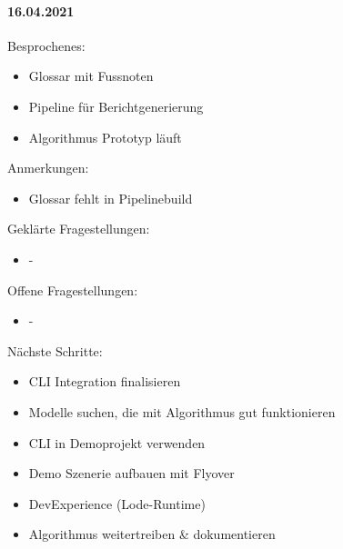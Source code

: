 \paragraph{16.04.2021}
Besprochenes:
\begin{itemize}
  \item Glossar mit Fussnoten
  \item Pipeline für Berichtgenerierung
  \item Algorithmus Prototyp läuft
\end{itemize}
Anmerkungen:
\begin{itemize}
  \item Glossar fehlt in Pipelinebuild
\end{itemize}
Geklärte Fragestellungen:
\begin{itemize}
  \item -
\end{itemize}
Offene Fragestellungen:
\begin{itemize}
  \item -
\end{itemize}
Nächste Schritte:
\begin{itemize}
  \item CLI Integration finalisieren
  \item {} Modelle suchen, die mit Algorithmus gut funktionieren
  \item CLI in Demoprojekt verwenden
  \item Demo Szenerie aufbauen mit Flyover
  \item DevExperience (Lode-Runtime)
  \item Algorithmus weitertreiben \& dokumentieren
\end{itemize}

\newpage

